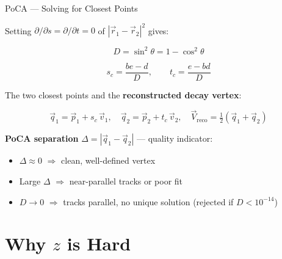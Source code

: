 \documentclass[aspectratio=169,10pt]{beamer}
\begin{document}
\begin{frame}{PoCA — Solving for Closest Points}

Setting $\partial/\partial s = \partial/\partial t = 0$ of $|\vec{r}_1 - \vec{r}_2|^2$ gives:

\begin{equation*}
    D = \sin^2\theta = 1 - \cos^2\theta
\end{equation*}

\begin{equation*}
    \boxed{s_c = \frac{be - d}{D}, \qquad t_c = \frac{e - bd}{D}}
\end{equation*}

\medskip
The two closest points and the \textbf{reconstructed decay vertex}:

\begin{equation*}
    \vec{q}_1 = \vec{p}_1 + s_c\,\vec{v}_1, \quad
    \vec{q}_2 = \vec{p}_2 + t_c\,\vec{v}_2, \quad
    \boxed{\vec{V}_\text{reco} = \tfrac{1}{2}(\vec{q}_1 + \vec{q}_2)}
\end{equation*}

\medskip
\textbf{PoCA separation} $\Delta = |\vec{q}_1 - \vec{q}_2|$ — quality indicator:
\begin{itemize}
    \item $\Delta \approx 0$ \quad $\Rightarrow$ clean, well-defined vertex
    \item Large $\Delta$ \quad $\Rightarrow$ near-parallel tracks or poor fit
    \item $D \to 0$ \quad $\Rightarrow$ tracks parallel, no unique solution (rejected if $D < 10^{-14}$)
\end{itemize}

\end{frame}

\section{Why \texorpdfstring{$z$}{z} is Hard}
\end{document}
